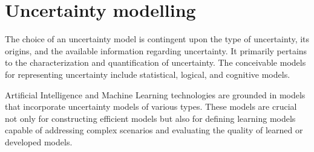 \section{Uncertainty modelling}

The choice of an uncertainty model is contingent upon the type of uncertainty, its origins, and the available information regarding uncertainty. 
It primarily pertains to the characterization and quantification of uncertainty. 
The conceivable models for representing uncertainty include statistical, logical, and cognitive models.

Artificial Intelligence and Machine Learning technologies are grounded in models that incorporate uncertainty models of various types. 
These models are crucial not only for constructing efficient models but also for defining learning models capable of addressing complex scenarios and evaluating the quality of learned or developed models.

